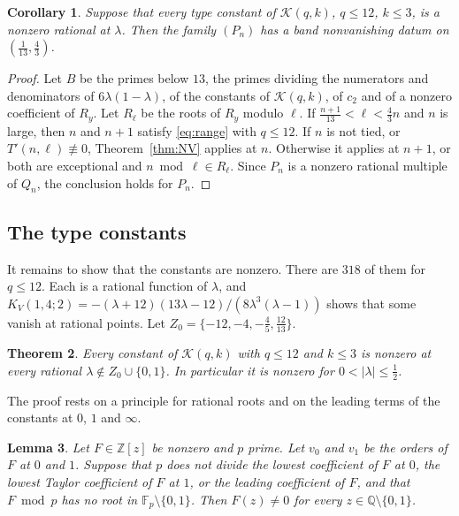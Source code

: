\documentclass[11pt]{amsart}
\newtheorem{theorem}{Theorem}[section]
\newtheorem{lemma}[theorem]{Lemma}
\newtheorem{corollary}[theorem]{Corollary}
\theoremstyle{definition}
\theoremstyle{remark}
\numberwithin{equation}{section}
\newcommand{\Z}{\mathbb Z}
\newcommand{\Q}{\mathbb Q}
\newcommand{\F}{\mathbb F}
\begin{document}
\begin{corollary}\label{cor:band}
Suppose that every type constant of $\mathcal K(q,k)$, $q\le12$, $k\le3$, is a nonzero rational at $\lambda$. Then the
family $(P_n)$ has a band nonvanishing datum on $(\frac1{13},\frac43)$.
\end{corollary}

\begin{proof}
Let $B$ be the primes below $13$, the primes dividing the numerators and denominators of $6\lambda(1-\lambda)$, of the
constants of $\mathcal K(q,k)$, of $c_2$ and of a nonzero coefficient of $R_y$. Let $R_\ell$ be the roots of $R_y$
modulo $\ell$. If $\frac{n+1}{13}<\ell<\frac43n$ and $n$ is large, then $n$ and $n+1$ satisfy \eqref{eq:range} with
$q\le12$. If $n$ is not tied, or $T'(n,\ell)\not\equiv0$, Theorem~\ref{thm:NV} applies at $n$. Otherwise it applies at
$n+1$, or both are exceptional and $n\bmod\ell\in R_\ell$. Since $P_n$ is a nonzero rational multiple of $Q_n$, the
conclusion holds for $P_n$.
\end{proof}

\subsection{The type constants}
It remains to show that the constants are nonzero. There are $318$ of them for $q\le12$. Each is a rational function
of $\lambda$, and $K_V(1,4;2)=-(\lambda+12)(13\lambda-12)/(8\lambda^3(\lambda-1))$ shows that some vanish at rational
points. Let $Z_0=\{-12,-4,-\frac45,\frac{12}{13}\}$.

\begin{theorem}\label{thm:types}
Every constant of $\mathcal K(q,k)$ with $q\le12$ and $k\le3$ is nonzero at every rational $\lambda\notin
Z_0\cup\{0,1\}$. In particular it is nonzero for $0<|\lambda|\le\frac12$.
\end{theorem}

The proof rests on a principle for rational roots and on the leading terms of the constants at $0$, $1$ and $\infty$.

\begin{lemma}\label{lem:R}
Let $F\in\Z[z]$ be nonzero and $p$ prime. Let $v_0$ and $v_1$ be the orders of $F$ at $0$ and $1$. Suppose that $p$ does
not divide the lowest coefficient of $F$ at $0$, the lowest Taylor coefficient of $F$ at $1$, or the leading
coefficient of $F$, and that $F\bmod p$ has no root in $\F_p\setminus\{0,1\}$. Then $F(z)\ne0$ for every
$z\in\Q\setminus\{0,1\}$.
\end{lemma}
\end{document}
